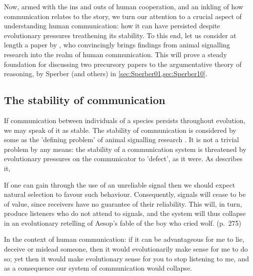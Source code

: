 Now, armed with the ins and outs of human cooperation, and an inkling of how communication relates to the story, we turn our attention to a crucial aspect of understanding human communication: how it can have persisted despite evolutionary pressures treathening its stability. To this end, let us consider at length a paper by \citet{Scott-Phillips08}, who convincingly brings findings from animal signalling research into the realm of human communication. This will prove a steady foundation for discussing two precursory papers to the argumentative theory of reasoning, by Sperber (and others) in \cref{sec:Sperber01,sec:Sperber10}.

\subsection{The stability of communication}
\label{sec:S-P08}



If communication between individuals of a species persists throughout evolution, we may speak of it as stable. The stability of communication is considered by some as the 'defining problem' of animal signalling research \citep{Scott-Phillips08}. It is not a trivial problem by any means: the stability of a communication system is threatened by evolutionary pressures on the communicator to 'defect', as it were. As \citet{Scott-Phillips08} describes it,
\begin{quoting}
    If one can gain through the use of an unreliable signal then we should expect natural selection to favour such behaviour. Consequently, signals will cease to be of value, since receivers have no guarantee of their reliability. This will, in turn, produce listeners who do not attend to signals, and the system will thus collapse in an evolutionary retelling of Aesop’s fable of the boy who cried wolf.
    \hfill (p.~275)
\end{quoting}
In the context of human communication: if it can be advantageous for me to lie, deceive or mislead someone, then it would evolutionarily make sense for me to do so; yet then it would make evolutionary sense for you to stop listening to me, and as a consequence our system of communication would collapse.

